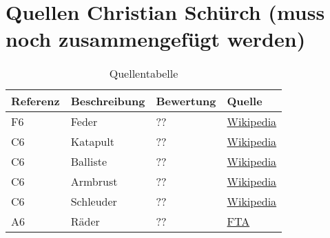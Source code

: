 \section{Quellen Christian Schürch (muss noch zusammengefügt werden)}

\begin{table}[h!]
	\centering
	\begin{tabular}{l l l l}
		Referenz & Beschreibung & Bewertung & Quelle \\
		\hline
        
        F6 & Feder & ?? & \href{http://de.wikipedia.org/wiki/Feder_(Technik)}{Wikipedia} \\
        
	    C6 & Katapult & ?? & \href{http://de.wikipedia.org/wiki/Katapult}{Wikipedia} \\
	    
	    C6 & Balliste & ?? & \href{http://de.wikipedia.org/wiki/Balliste}{Wikipedia} \\
	    
	    C6 & Armbrust & ?? & \href{http://de.wikipedia.org/wiki/Armbrust}{Wikipedia} \\
	    
	    C6 & Schleuder & ?? & \href{http://de.wikipedia.org/wiki/Zwille}{Wikipedia} \\
        
        A6 & Räder & ?? & \href{http://www.fta.ch/de/r/raeder-2000.html}{FTA} \\
        
	\end{tabular}
	\caption{Quellentabelle}
	\label{tab:quelle}
\end{table}

